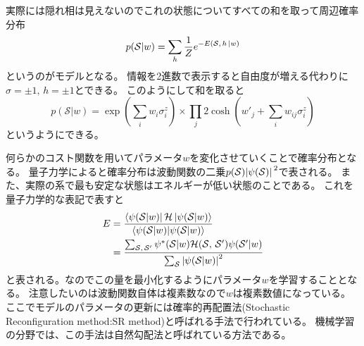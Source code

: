 \documentclass[twocolumn,10pt,dvipdfmx,a4paper]{jsarticle}
\begin{document}
実際には隠れ相は見えないのでこれの状態についてすべての和を取って周辺確率分布
\begin{equation}
    p(\mathcal{S}|w)=\sum_h \frac{1}{Z}e^{-E\qty(\mathcal{S},\,h\, | w )}
\end{equation}
というのがモデルとなる。
情報を2進数で表示すると自由度が増える代わりに\(\sigma=\pm 1,\,h=\pm1\)とできる。
このようにして和を取ると
\begin{equation}
    p(\mathcal{S}|w)=\exp(\sum_i w_i\sigma_i^z)\times\prod_j 2\cosh({w'}_j+\sum_i w_{ij}\sigma_i^z)
\end{equation}
というようにできる。

何らかのコスト関数を用いてパラメータ\(w\)を変化させていくことで確率分布となる。
量子力学によると確率分布は波動関数の二乗\(p(\mathcal{S})\abs*{\psi(\mathcal{S})}^2\)で表される。
また、実際の系で最も安定な状態はエネルギーが低い状態のことである。
これを量子力学的な表記で表すと
\begin{align}
    E &= \frac{\bra{\psi(\mathcal{S}|w)}\mathcal{H}\ket{\psi(\mathcal{S}|w)}}{\braket{\psi(\mathcal{S}|w)}}\\
    &= \frac{\sum_{\mathcal{S},\, \mathcal{S}'}\psi^*(\mathcal{S}|w)\mathcal{H}(\mathcal{S},\,\mathcal{S}')\psi(\mathcal{S}'|w)}{\sum_\mathcal{S} \abs{\psi(\mathcal{S}|w)}^2}
\end{align}
と表される。なのでこの量を最小化するようにパラメータ\(w\)を学習することとなる。
注意したいのは波動関数自体は複素数なので\(w\)は複素数値になっている。
ここでモデルのパラメータの更新には確率的再配置法(Stochastic Reconfiguration method:SR method)と呼ばれる手法で行われている。
機械学習の分野では、この手法は自然勾配法と呼ばれている方法である。
\end{document}
